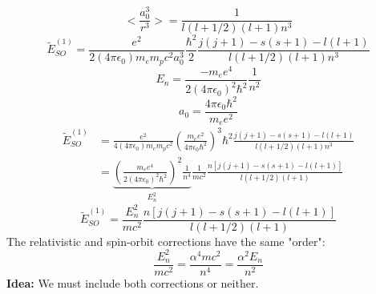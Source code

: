 \documentclass[12pt,fancychapters]{report}
\numberwithin{equation}{section}
\begin{document}
\[
  \bigg< \frac{a_0^3}{r^3}\bigg> = \frac{1}{l(l+1/2)(l+1)n^3}
\]
\[
  \tilde{E}^{(1)}_{SO} = \frac{e^2}{2(4\pi\epsilon_0)m_e m_p c^2 a_0^3}\frac{\hbar^2}{2}
  \frac{j(j+1) - s(s+1)- l(l+1)}{l(l+1/2)(l+1)n^3}
\]
\[
  E_n = \frac{-m_e e^4}{2(4\pi\epsilon_0)^2\hbar^2}\frac{1}{n^2}
\]
\[
  a_0 = \frac{4\pi \epsilon_0 \hbar^2}{m_e e^2}
\]
\begin{align*}
  \tilde{E}^{(1)}_{SO} &= \frac{e^2}{4(4\pi\epsilon_0)m_e m_p c^2}\left(\frac{m_e e^2}
  {4\pi\epsilon_0\hbar^2}\right)^3
 \hbar^2\frac{j(j+1) - s(s+1)- l(l+1)}{l(l+1/2)(l+1)n^3}\\
  &= \underbrace{\left(\frac{m_e e^4}{2(4\pi\epsilon_0)^2 \hbar^2}\right)^2 \frac{1}{n^4}}
  _{E_n^2}
  \frac{1}{mc^2}\frac{n[j(j+1) - s(s+1)- l(l+1) ]}{ l(l+1/2)(l+1) }
  \end{align*}
  \begin{equation}
    \boxed{
  \tilde{E}_{SO}^{(1)} = \frac{E_n^2}{mc^2} \frac{ n[j(j+1) - s(s+1)- l(l+1) ] }
  {l(l+1/2)(l+1)}
}
\end{equation}
The relativistic and spin-orbit corrections have the same "order":
\[
  \frac{E_n^2}{mc^2} = \frac{\alpha^4 mc^2}{n^4} = \frac{\alpha^2 E_n}{n^2}
\]
\textbf{Idea:} We must include both corrections or neither.
\newpage
\clearpage
\end{document}
